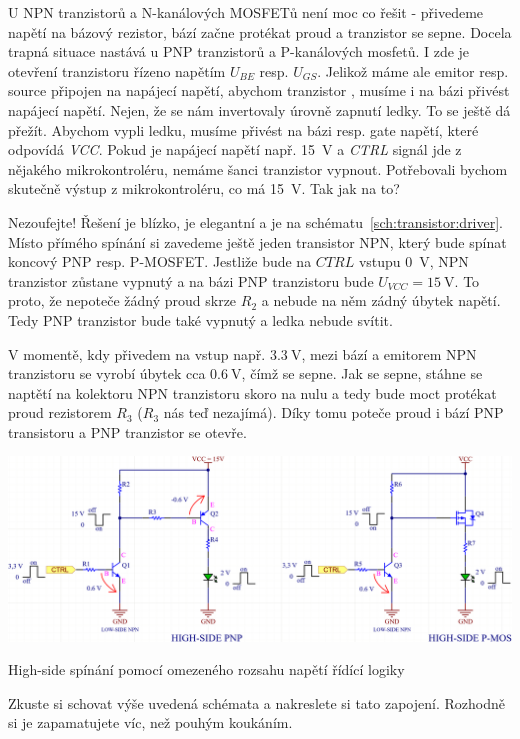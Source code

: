 \documentclass[a4paper,12pt]{article}   %
\begin{document}
U NPN tranzistorů a N-kanálových MOSFETů není moc co řešit - přivedeme napětí na bázový rezistor, bází začne protékat proud a tranzistor se sepne. Docela trapná situace nastává u PNP tranzistorů a P-kanálových mosfetů. I zde je otevření tranzistoru řízeno napětím $U_{BE}$ resp. $U_{GS}$. Jelikož máme ale emitor resp. source připojen na napájecí napětí, abychom tranzistor , musíme i na bázi přivést napájecí napětí. Nejen, že se nám invertovaly úrovně zapnutí ledky. To se ještě dá přežít. Abychom vypli ledku, musíme přivést na bázi resp. gate napětí, které odpovídá \textit{VCC}. Pokud je napájecí napětí např. 15~V a \textit{CTRL} signál jde z nějakého mikrokontroléru, nemáme šanci tranzistor vypnout. Potřebovali bychom skutečně výstup z mikrokontroléru, co má 15~V. Tak jak na to?

Nezoufejte! Řešení je blízko, je elegantní a je na schématu~\ref{sch:transistor:driver}. Místo přímého spínání si zavedeme ještě jeden transistor NPN, který bude spínat koncový PNP resp. P-MOSFET. Jestliže bude na $CTRL$ vstupu 0~V, NPN tranzistor zůstane vypnutý a na bázi PNP tranzistoru bude $U_{VCC} = 15~\text{V}$. To proto, že nepoteče žádný proud skrze $R_2$ a nebude na něm zádný úbytek napětí. Tedy PNP tranzistor bude také vypnutý a ledka nebude svítit. 

V momentě, kdy přivedem na vstup např. $3.3~\text{V}$, mezi bází a emitorem NPN tranzistoru se vyrobí úbytek cca $0.6~\text{V}$, čímž se sepne. Jak se sepne, stáhne se naptětí na kolektoru NPN tranzistoru skoro na nulu a tedy bude moct protékat proud rezistorem $R_3$ ($R_3$ nás teď nezajímá). Díky tomu poteče proud i bází PNP transistoru a PNP tranzistor se otevře.

\begin{schema}
    \centering
    \includegraphics[width=.7\textwidth]{tranzistory-spinace_driver.PNG}
    \caption{High-side spínání pomocí omezeného rozsahu napětí řídící logiky}
    \label{sch:transistor:driver}
\end{schema}

Zkuste si schovat výše uvedená schémata a nakreslete si tato zapojení. Rozhodně si je zapamatujete víc, než pouhým koukáním.
\end{document}
